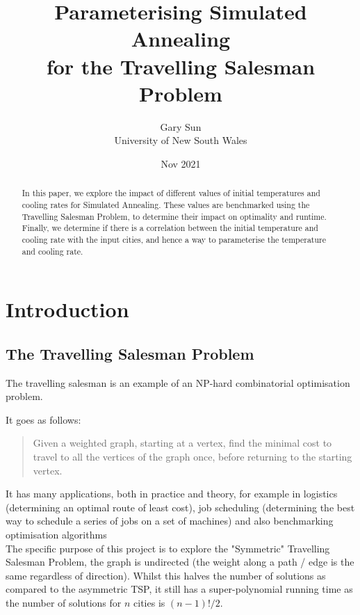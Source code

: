 \documentclass{article}
\title{
    Parameterising Simulated Annealing \\
    \large for the Travelling Salesman Problem
}
\author{
    Gary Sun \\
    \large University of New South Wales
}
\date{Nov 2021}
\begin{document}

\maketitle
\begin{abstract}
    \centering
    In this paper, we explore the impact of different values of initial temperatures and cooling rates for Simulated Annealing.
    These values are benchmarked using the Travelling Salesman Problem, to determine their impact on optimality and runtime. 
    Finally, we determine if there is a correlation between the initial temperature and cooling rate with the input cities, and hence a way to parameterise the temperature and cooling rate.
\end{abstract}
\tableofcontents
\restoregeometry

\newpage
\section{Introduction}
\subsection{The Travelling Salesman Problem}
The travelling salesman is an example of an NP-hard combinatorial optimisation problem.

It goes as follows:
\begin{quote}
Given a weighted graph, starting at a vertex, find the minimal cost to travel to all the vertices of the graph once, before returning to the starting vertex.
\end{quote}

It has many applications, both in practice and theory, for example in logistics (determining an optimal route of least cost), job scheduling (determining the best way to schedule a series of jobs on a set of machines) and also benchmarking optimisation algorithms
\\

The specific purpose of this project is to explore the "Symmetric" Travelling Salesman Problem, the graph is undirected (the weight along a path / edge is the same regardless of direction).
Whilst this halves the number of solutions as compared to the asymmetric TSP, it still has a super-polynomial running time as the number of solutions for $n$ cities is $(n - 1)! / 2$.
\end{document}
